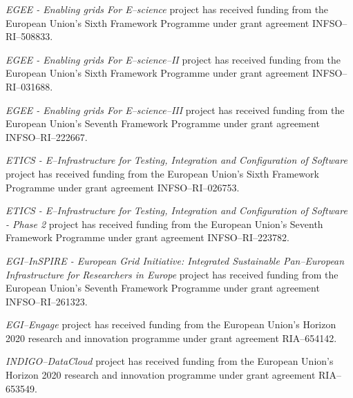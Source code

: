 \documentclass[journal]{IEEEtran}
\begin{document}
{\sl EGEE - Enabling grids For E--science} project has received funding from the European Union's Sixth Framework Programme under grant agreement INFSO--RI--508833.

{\sl EGEE - Enabling grids For E--science--II} project has received funding from the European Union's Sixth Framework Programme under grant agreement INFSO--RI--031688.

{\sl EGEE - Enabling grids For E--science--III} project has received funding from the European Union's Seventh Framework Programme under grant agreement INFSO--RI--222667.

{\sl ETICS - E--Infrastructure for Testing, Integration and Configuration of Software} project has received funding from the European Union's Sixth Framework Programme under grant agreement INFSO--RI--026753.

{\sl ETICS - E--Infrastructure for Testing, Integration and Configuration of Software - Phase 2} project has received funding from the European Union's Seventh Framework Programme under grant agreement INFSO--RI--223782.

{\sl EGI--InSPIRE - European Grid Initiative: Integrated Sustainable Pan--European Infrastructure for Researchers in Europe} project has received funding from the European Union's Seventh Framework Programme under grant agreement INFSO--RI--261323.

{\sl EGI--Engage} project has received funding from the European Union's Horizon 2020 research and innovation programme under grant agreement RIA--654142.

{\sl INDIGO--DataCloud} project has received funding from the European Union's Horizon 2020 research and innovation programme under grant agreement RIA--653549.
\end{document}
